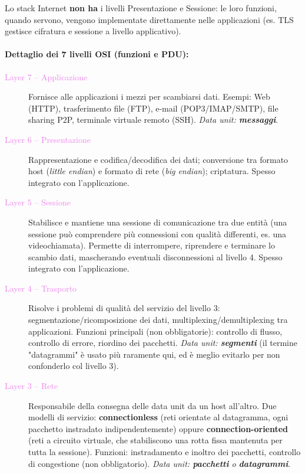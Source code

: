 \documentclass[12pt, a4paper]{article}
\begin{document}
Lo stack Internet \textbf{non ha} i livelli Presentazione e Sessione: le loro funzioni, quando servono, vengono implementate direttamente nelle applicazioni (es. TLS gestisce cifratura e sessione a livello applicativo).

\paragraph{Dettaglio dei 7 livelli OSI (funzioni e PDU):}

\begin{description}
    \item[\textcolor{violet}{Layer 7 -- Applicazione}] Fornisce alle applicazioni i mezzi per scambiarsi dati. Esempi: Web (HTTP), trasferimento file (FTP), e-mail (POP3/IMAP/SMTP), file sharing P2P, terminale virtuale remoto (SSH). \textit{Data unit: \textbf{messaggi}}.
    \item[\textcolor{violet}{Layer 6 -- Presentazione}] Rappresentazione e codifica/decodifica dei dati; conversione tra formato host (\textit{little endian}) e formato di rete (\textit{big endian}); criptatura. Spesso integrato con l'applicazione.
    \item[\textcolor{violet}{Layer 5 -- Sessione}] Stabilisce e mantiene una sessione di comunicazione tra due entità (una sessione può comprendere più connessioni con qualità differenti, es. una videochiamata). Permette di interrompere, riprendere e terminare lo scambio dati, mascherando eventuali disconnessioni al livello 4. Spesso integrato con l'applicazione.
    \item[\textcolor{violet}{Layer 4 -- Trasporto}] Risolve i problemi di qualità del servizio del livello 3: segmentazione/ricomposizione dei dati, multiplexing/demultiplexing tra applicazioni. Funzioni principali (non obbligatorie): controllo di flusso, controllo di errore, riordino dei pacchetti. \textit{Data unit: \textbf{segmenti}} (il termine "datagrammi" è usato più raramente qui, ed è meglio evitarlo per non confonderlo col livello 3).
    \item[\textcolor{violet}{Layer 3 -- Rete}] Responsabile della consegna delle data unit da un host all'altro. Due modelli di servizio: \textbf{connectionless} (reti orientate al datagramma, ogni pacchetto instradato indipendentemente) oppure \textbf{connection-oriented} (reti a circuito virtuale, che stabiliscono una rotta fissa mantenuta per tutta la sessione). Funzioni: instradamento e inoltro dei pacchetti, controllo di congestione (non obbligatorio). \textit{Data unit: \textbf{pacchetti} o \textbf{datagrammi}}.

\end{description}
\end{document}
